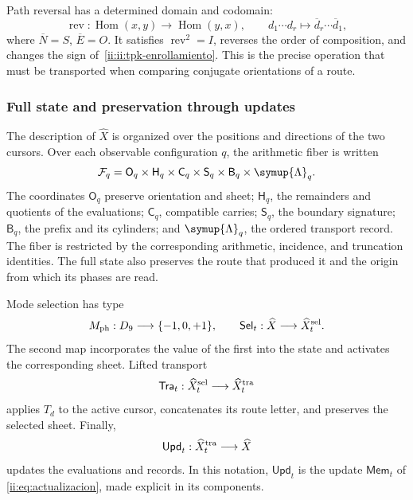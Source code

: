 Path reversal has a determined domain and codomain:
\[
 \operatorname{rev}:\operatorname{Hom}(x,y)
 \longrightarrow\operatorname{Hom}(y,x),\qquad
 d_1\cdots d_r\longmapsto\overline d_r\cdots\overline d_1,
\]
where \(\overline N=S\), \(\overline E=O\). It satisfies
\(\operatorname{rev}^2=I\), reverses the order of composition, and changes the
sign of~\eqref{ii:ii:tpk-enrollamiento}. This is the precise operation that
must be transported when comparing conjugate orientations of a route.

\subsubsection{Full state and preservation through updates}

The description of \(\widehat X\) is organized over the positions and
directions of the two cursors. Over each observable configuration
\(q\), the arithmetic fiber is written
\begin{equation}
 \mathcal F_q=
 \mathsf O_q\times\mathsf H_q\times\mathsf C_q\times
 \mathsf S_q\times\mathsf B_q\times\symup{\Lambda}_q.
 \label{ii:ii:tpk-fibra}
\end{equation}
The coordinates \(\mathsf O_q\) preserve orientation and sheet;
\(\mathsf H_q\), the remainders and quotients of the evaluations;
\(\mathsf C_q\), compatible carries;
\(\mathsf S_q\), the boundary signature;
\(\mathsf B_q\), the prefix and its cylinders; and
\(\symup{\Lambda}_q\), the ordered transport record. The fiber is
restricted by the corresponding arithmetic, incidence, and
truncation identities. The full state also preserves the route
that produced it and the origin from which its phases are read.

Mode selection has type
\[
 M_{\rm ph}:D_9\longrightarrow\{-1,0,+1\},\qquad
 \mathsf{Sel}_t:\widehat X\longrightarrow\widehat X^{\rm sel}_t.
\]
The second map incorporates the value of the first into the state and
activates the corresponding sheet. Lifted transport
\[
 \mathsf{Tra}_t:\widehat X^{\rm sel}_t
 \longrightarrow\widehat X^{\rm tra}_t
\]
applies \(T_d\) to the active cursor, concatenates its route letter, and preserves the
selected sheet. Finally,
\[
 \mathsf{Upd}_t:\widehat X^{\rm tra}_t\longrightarrow\widehat X
\]
updates the evaluations and records. In this notation,
\(\mathsf{Upd}_t\) is the update \(\mathsf{Mem}_t\) of
\eqref{ii:eq:actualizacion}, made explicit in its components.

